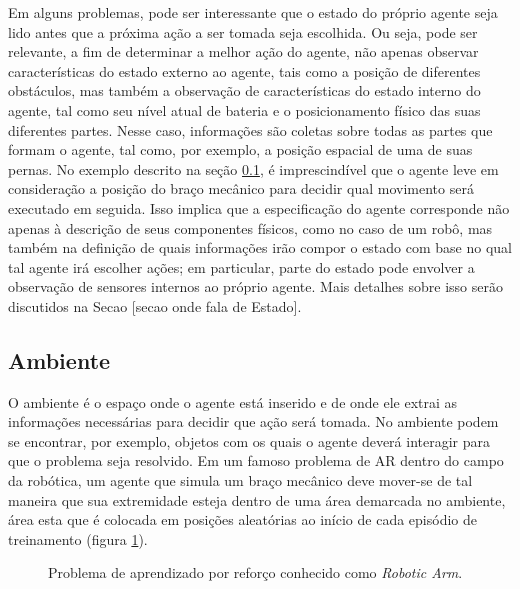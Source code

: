\documentclass[cic,tc]{iiufrgs}
\begin{document}
Em alguns problemas, pode ser interessante que o estado do próprio agente seja lido antes que a próxima ação a ser tomada seja escolhida.
Ou seja, pode ser relevante, a fim de determinar a melhor ação do agente, não apenas observar características do estado externo ao agente,
 tais como a posição de diferentes obstáculos, mas também a observação de características do estado interno do agente, tal como seu nível atual de bateria
 e o posicionamento físico das suas diferentes partes.
Nesse caso, informações são coletas sobre todas as partes que formam o agente, tal como, por exemplo, a posição espacial de uma de
suas pernas. No exemplo descrito na seção \ref{ambiente}, é imprescindível que o agente leve em consideração a posição do braço mecânico
para decidir qual movimento será executado em seguida. Isso implica que a especificação do agente corresponde não apenas à descrição de seus
componentes físicos, como no caso de um robô, mas também na definição de quais informações irão compor o estado com base no qual tal agente irá escolher ações;
em particular, parte do estado pode envolver a observação de sensores internos ao próprio agente. Mais detalhes sobre isso serão discutidos
 na Secao [secao onde fala de Estado].


\subsection{Ambiente}
\label{ambiente}
O ambiente é o espaço onde o agente está inserido e de onde ele extrai as informações necessárias para decidir que ação será tomada.
No ambiente podem se encontrar, por exemplo, objetos com os quais o agente deverá interagir para que o problema seja resolvido.
Em um famoso problema de AR dentro do campo da robótica, um agente que simula um braço mecânico deve mover-se de tal maneira que
sua extremidade esteja dentro de uma área demarcada no ambiente, área esta que é colocada em posições aleatórias ao início de cada episódio
de treinamento (figura \ref{fig:roboticarm}). \par

\begin{figure}[h]
    \caption{Problema de aprendizado por reforço conhecido como \textit{Robotic Arm}.}
    \begin{center}
    \end{center}
    \label{fig:roboticarm}
\end{figure}
\end{document}

